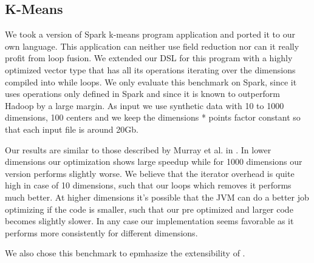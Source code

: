 \subsection{K-Means}
\label{subsec:kmeans}

We took a version of Spark k-means program  application and ported it to our own language. This application can neither use field reduction nor can it really profit from loop fusion. We extended our DSL for this program with a highly optimized vector type that has all its operations iterating over the dimensions compiled into while loops. We only evaluate this benchmark on Spark, since it uses operations only defined in Spark and since it is known to outperform Hadoop by a large margin. As input we use synthetic data with 10 to 1000 dimensions, 100 centers and we keep the dimensions * points factor constant so that each input file is around 20Gb.

Our results are similar to those described by Murray et al. in \cite{murStenomurray_steno:_2011}. In lower dimensions our optimization shows large speedup while for 1000 dimensions our version performs slightly worse. We believe that the iterator overhead is quite high in case of 10 dimensions, such that our loops which removes it performs much better. At higher dimensions it's possible that the JVM can do a better job optimizing if the code is smaller, such that our pre optimized and larger code becomes slightly slower. In any case our implementation seems favorable as it performs more consistently for different dimensions.

We also chose this benchmark to epmhasize the extensibility of \tool.
